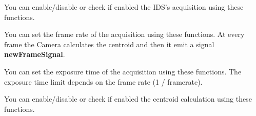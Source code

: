 You can enable/disable or check if enabled the IDS's acquisition using
these functions.

\begin{Shaded}
\begin{Highlighting}[]
\end{Highlighting}
\end{Shaded}

You can set the frame rate of the acquisition using these functions. At
every frame the Camera calculates the centroid and then it emit a signal
\textbf{newFrameSignal}.

\begin{Shaded}
\begin{Highlighting}[]
\NormalTok{;}
\end{Highlighting}
\end{Shaded}

You can set the exposure time of the acquisition using these functions.
The exposure time limit depends on the frame rate (1 / framerate).

\begin{Shaded}
\begin{Highlighting}[]
\NormalTok{ / }\NormalTok{;}
\end{Highlighting}
\end{Shaded}

You can enable/disable or check if enabled the centroid calculation
using these functions.

\begin{Shaded}
\begin{Highlighting}[]
\NormalTok{);}
\NormalTok{);}
\end{Highlighting}
\end{Shaded}

